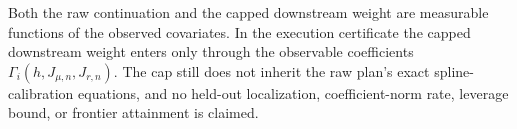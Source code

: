 Both the raw continuation and the capped downstream weight are measurable functions of the observed covariates. In the execution certificate the capped downstream weight enters only through the observable coefficients \(\Gamma_i(h,J_{\mu,n},J_{r,n})\). The cap still does not inherit the raw plan's exact spline-calibration equations, and no held-out localization, coefficient-norm rate, leverage bound, or frontier attainment is claimed.
